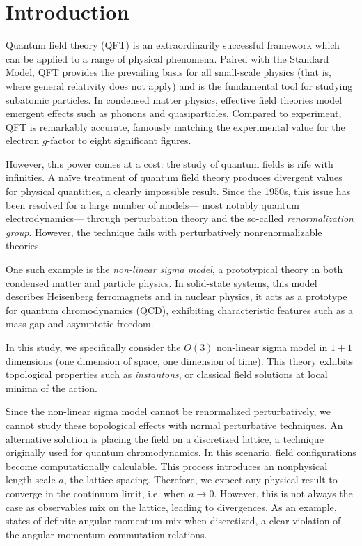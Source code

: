 \documentclass[12pt]{report}
\newcommand{\citeneeded}{}
\begin{document}
\chapter{Introduction}

Quantum field theory (QFT) is an extraordinarily successful framework which can be applied to a range of physical phenomena. Paired with the Standard Model, QFT provides the prevailing basis for all small-scale physics (that is, where general relativity does not apply) and is the fundamental tool for studying subatomic particles. In condensed matter physics, effective field theories model emergent effects such as phonons and quasiparticles. Compared to experiment, QFT is remarkably accurate, famously matching the experimental value for the electron $g$-factor to eight significant figures.\cite{weisskopf1981} 

However, this power comes at a cost: the study of quantum fields is rife with infinities. A na\"ive treatment of quantum field theory produces divergent values for physical quantities, a clearly impossible result. Since the 1950s, this issue has been resolved for a large number of models--- most notably quantum electrodynamics--- through perturbation theory and the so-called \textit{renormalization group}. However, the technique fails with perturbatively nonrenormalizable theories. 

One such example is the \textit{non-linear sigma model}, a prototypical theory in both condensed matter and particle physics. In solid-state systems, this model describes Heisenberg ferromagnets and in nuclear physics, it acts as a prototype for quantum chromodynamics (QCD), exhibiting characteristic features such as a mass gap and asymptotic freedom. \citeneeded

In this study, we specifically consider the $O(3)$ non-linear sigma model in $1+1$ dimensions (one dimension of space, one dimension of time). This theory exhibits topological properties such as \textit{instantons}, or classical field solutions at local minima of the action.



Since the non-linear sigma model cannot be renormalized perturbatively, we cannot study these topological effects with normal perturbative techniques. An alternative solution is placing the field on a discretized lattice, a technique originally used for quantum chromodynamics. In this scenario, field configurations become computationally calculable. This process introduces an nonphysical length scale $a$, the lattice spacing. Therefore, we expect any physical result to converge in the continuum limit, i.e. when $a\rightarrow 0$. However, this is not always the case as observables mix on the lattice, leading to divergences. As an example, states of definite angular momentum mix when discretized, a clear violation of the angular momentum commutation relations. 
\end{document}
